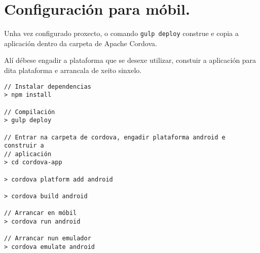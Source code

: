   \section{Configuración para móbil.}

  Unha vez configurado proxecto, o comando \lstinline{gulp deploy} construe 
e copia a aplicación dentro da carpeta de Apache Cordova.

  Alí débese engadir a plataforma que se desexe utilizar, constuir a 
aplicación para dita plataforma e arrancala de xeito sinxelo.

    \lstset{}
    \begin{lstlisting}[caption=Configuración e execución móbil]
// Instalar dependencias
> npm install

// Compilación
> gulp deploy

// Entrar na carpeta de cordova, engadir plataforma android e construir a 
// aplicación
> cd cordova-app

> cordova platform add android

> cordova build android

// Arrancar en móbil
> cordova run android

// Arrancar nun emulador
> cordova emulate android

    \end{lstlisting}

\thispagestyle{empty}
